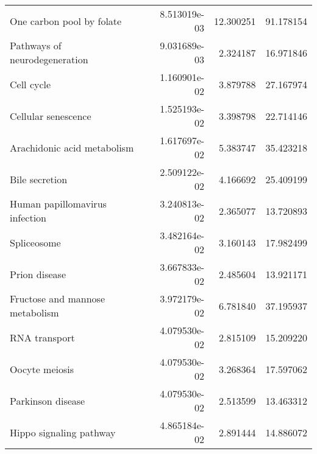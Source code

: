 \begin{tabular}{lrrr}
                   One carbon pool by folate &      8.513019e-03 & 12.300251 &       91.178154 \\
               Pathways of neurodegeneration &      9.031689e-03 &  2.324187 &       16.971846 \\
                                  Cell cycle &      1.160901e-02 &  3.879788 &       27.167974 \\
                         Cellular senescence &      1.525193e-02 &  3.398798 &       22.714146 \\
                 Arachidonic acid metabolism &      1.617697e-02 &  5.383747 &       35.423218 \\
                              Bile secretion &      2.509122e-02 &  4.166692 &       25.409199 \\
              Human papillomavirus infection &      3.240813e-02 &  2.365077 &       13.720893 \\
                                 Spliceosome &      3.482164e-02 &  3.160143 &       17.982499 \\
                               Prion disease &      3.667833e-02 &  2.485604 &       13.921171 \\
             Fructose and mannose metabolism &      3.972179e-02 &  6.781840 &       37.195937 \\
                               RNA transport &      4.079530e-02 &  2.815109 &       15.209220 \\
                              Oocyte meiosis &      4.079530e-02 &  3.268364 &       17.597062 \\
                           Parkinson disease &      4.079530e-02 &  2.513599 &       13.463312 \\
                     Hippo signaling pathway &      4.865184e-02 &  2.891444 &       14.886072 \\
\bottomrule
\end{tabular}
